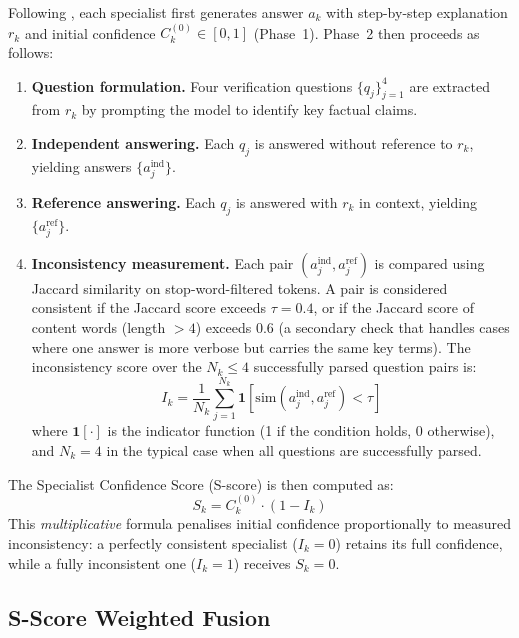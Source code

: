 \documentclass[10pt]{article}
\begin{document}
Following \citet{wu2024uncertainty}, each specialist first generates answer
$a_k$ with step-by-step explanation $r_k$ and initial confidence
$C_k^{(0)} \in [0,1]$ (Phase~1).  Phase~2 then proceeds as follows:
\begin{enumerate}
    \item \textbf{Question formulation.} Four verification questions $\{q_j\}_{j=1}^4$
          are extracted from $r_k$ by prompting the model to identify key
          factual claims.
    \item \textbf{Independent answering.} Each $q_j$ is answered without
          reference to $r_k$, yielding answers $\{a_j^{\text{ind}}\}$.
    \item \textbf{Reference answering.} Each $q_j$ is answered with $r_k$
          in context, yielding $\{a_j^{\text{ref}}\}$.
    \item \textbf{Inconsistency measurement.}  Each pair
          $(a_j^{\text{ind}}, a_j^{\text{ref}})$ is compared using
          Jaccard similarity on stop-word-filtered tokens.  A pair is
          considered consistent if the Jaccard score exceeds $\tau = 0.4$,
          or if the Jaccard score of content words (length $> 4$) exceeds
          $0.6$ (a secondary check that handles cases where one answer is
          more verbose but carries the same key terms).
          The inconsistency score over the $N_k \leq 4$ successfully
          parsed question pairs is:
          \begin{equation}
          I_k = \frac{1}{N_k}\sum_{j=1}^{N_k}
                \mathbf{1}\!\left[\text{sim}(a_j^{\text{ind}}, a_j^{\text{ref}}) < \tau\right]
          \label{eq:inconsistency}
          \end{equation}
          where $\mathbf{1}[\cdot]$ is the indicator function (1 if the
          condition holds, 0 otherwise), and $N_k = 4$ in the typical case
          when all questions are successfully parsed.
\end{enumerate}

The Specialist Confidence Score (S-score) is then computed as:
\begin{equation}
S_k = C_k^{(0)} \cdot (1 - I_k)
\label{eq:sscore}
\end{equation}
This \emph{multiplicative} formula penalises initial confidence proportionally
to measured inconsistency: a perfectly consistent specialist ($I_k=0$) retains
its full confidence, while a fully inconsistent one ($I_k=1$) receives
$S_k=0$.

\subsection{S-Score Weighted Fusion}
\label{sec:fusion}
\end{document}
